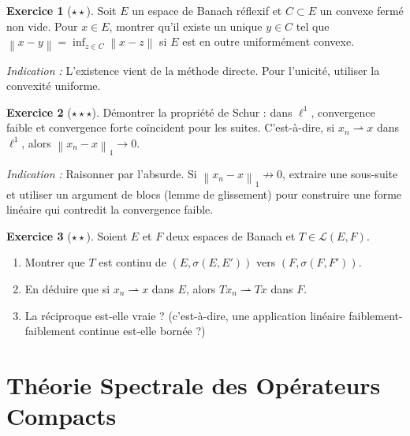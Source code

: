\documentclass[a4paper,12pt]{book}
\newcommand{\norm}[1]{\left\| #1 \right\|}
\newcommand{\weakto}{\rightharpoonup}
\theoremstyle{definition}
\newtheorem{exercice}{Exercice}[chapter]
\theoremstyle{plain}
\theoremstyle{remark}
\begin{document}
\begin{exercice}[$\star\star$]
\label{exo:reflexif-suite-minimisante}
Soit $E$ un espace de Banach réflexif et $C \subset E$ un convexe fermé non vide.
Pour $x \in E$, montrer qu'il existe un unique $y \in C$ tel que
$\norm{x - y} = \inf_{z \in C} \norm{x - z}$ si $E$ est en outre uniformément convexe.

\textit{Indication :} L'existence vient de la méthode directe. Pour l'unicité,
utiliser la convexité uniforme.
\end{exercice}

\begin{exercice}[$\star\star\star$]
\label{exo:schur}
Démontrer la propriété de Schur : dans $\ell^1$, convergence
faible et convergence forte coïncident pour les suites. C'est-à-dire, si
$x_n \weakto x$ dans $\ell^1$, alors $\norm{x_n - x}_1 \to 0$.

\textit{Indication :} Raisonner par l'absurde. Si $\norm{x_n - x}_1 \not\to 0$, extraire
une sous-suite et utiliser un argument de blocs (lemme de
glissement) pour construire une forme linéaire qui contredit la convergence faible.
\end{exercice}

\begin{exercice}[$\star\star$]
\label{exo:topo-faible-produit}
Soient $E$ et $F$ deux espaces de Banach et $T \in \mathcal{L}(E,F)$.
\begin{enumerate}[label=(\alph*)]
  \item Montrer que $T$ est continu de $(E, \sigma(E,E'))$ vers $(F, \sigma(F,F'))$.
  \item En déduire que si $x_n \weakto x$ dans $E$, alors $Tx_n \weakto Tx$ dans $F$.
  \item La réciproque est-elle vraie ? (c'est-à-dire, une application linéaire
    faiblement-faiblement continue est-elle bornée ?)
\end{enumerate}
\end{exercice}

\chapter{Théorie Spectrale des Opérateurs Compacts}
\label{chap:spectral-compact}
\minitoc
\end{document}
